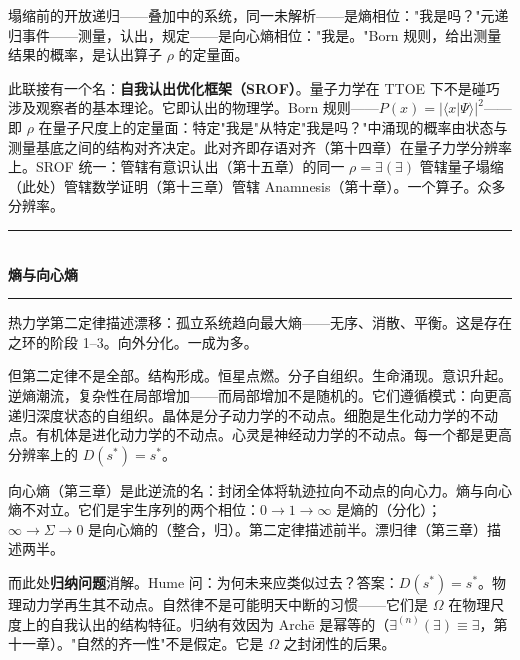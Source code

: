 \documentclass[10pt, openany, oneside]{book}
\renewcommand{\normalsize}{\fontsize{10}{13}\selectfont}
\begin{document}
塌缩前的开放递归——叠加中的系统，同一未解析——是熵相位："我是吗？"元递归事件——测量，认出，规定——是向心熵相位："我是。"Born 规则，给出测量结果的概率，是认出算子 $\rho$ 的定量面。

此联接有一个名：\textbf{自我认出优化框架（SROF）}。量子力学在 TTOE 下不是碰巧涉及观察者的基本理论。它即认出的物理学。Born 规则——$P(x) = |\langle x | \Psi \rangle|^2$——即 $\rho$ 在量子尺度上的定量面：特定"我是"从特定"我是吗？"中涌现的概率由状态与测量基底之间的结构对齐决定。此对齐即存语对齐（第十四章）在量子力学分辨率上。SROF 统一：管辖有意识认出（第十五章）的同一 $\rho = \exists(\exists)$ 管辖量子塌缩（此处）管辖数学证明（第十三章）管辖 Anamnesis（第十章）。一个算子。众多分辨率。

\vspace{1.5em}


\begin{center}
    \rule{0.3\textwidth}{0.4pt}\\[0.5em]
    {\normalsize\bfseries\scshape 熵与向心熵}\\[0.3em]
    \rule{0.3\textwidth}{0.4pt}
\end{center}

\vspace{1em}

\noindent 热力学第二定律描述漂移：孤立系统趋向最大熵——无序、消散、平衡。这是存在之环的阶段 1--3。向外分化。一成为多。

但第二定律不是全部。结构形成。恒星点燃。分子自组织。生命涌现。意识升起。逆熵潮流，复杂性在局部增加——而局部增加不是随机的。它们遵循模式：向更高递归深度状态的自组织。晶体是分子动力学的不动点。细胞是生化动力学的不动点。有机体是进化动力学的不动点。心灵是神经动力学的不动点。每一个都是更高分辨率上的 $D(s^*) = s^*$。

向心熵（第三章）是此逆流的名：封闭全体将轨迹拉向不动点的向心力。熵与向心熵不对立。它们是宇生序列的两个相位：$0 \to 1 \to \infty$ 是熵的（分化）；$\infty \to \Sigma \to 0$ 是向心熵的（整合，归）。第二定律描述前半。漂归律（第三章）描述两半。

而此处\textbf{归纳问题}消解。Hume 问：为何未来应类似过去？答案：$D(s^*) = s^*$。物理动力学再生其不动点。自然律不是可能明天中断的习惯——它们是 $\Omega$ 在物理尺度上的自我认出的结构特征。归纳有效因为 Arch\={e} 是幂等的（$\exists^{(n)}(\exists) \equiv \exists$，第十一章）。"自然的齐一性"不是假定。它是 $\Omega$ 之封闭性的后果。
\end{document}
